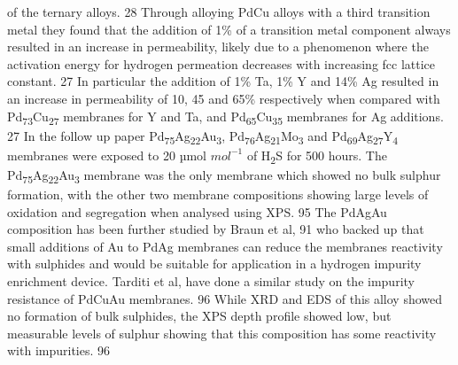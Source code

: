 of the ternary alloys. 28 Through alloying PdCu alloys with a third transition metal they 
found that the addition of 1\% of a transition metal component always resulted in an increase 
in permeability, likely due to a phenomenon where the activation energy for hydrogen 
permeation decreases with increasing fcc lattice constant. 27 In particular the addition of 
1\% Ta, 1\% Y and 14\% Ag resulted in an increase in permeability of 10, 45 and 65\% 
respectively when compared with Pd\textsubscript{73}Cu\textsubscript{27} membranes for 
Y and Ta, and Pd\textsubscript{65}Cu\textsubscript{35} membranes for Ag additions. 27 
In the follow up paper Pd\textsubscript{75}Ag\textsubscript{22}Au\textsubscript{3},
Pd\textsubscript{76}Ag\textsubscript{21}Mo\textsubscript{3} and Pd\textsubscript{69}Ag\textsubscript{27}Y\textsubscript{4} 
membranes were exposed to 20 µmol $mol^{-1}$ of H\textsubscript{2}S for 500 hours. 
The Pd\textsubscript{75}Ag\textsubscript{22}Au\textsubscript{3} membrane was the only 
membrane which showed no bulk sulphur formation, with the other two membrane compositions 
showing large levels of oxidation and segregation when analysed using XPS. 95 The 
PdAgAu composition has been further studied by Braun et al, 91 who backed up that small 
additions of Au to PdAg membranes can reduce the membranes reactivity with sulphides and 
would be suitable for application in a hydrogen impurity enrichment device. 
Tarditi et al, have done a similar study on the impurity resistance of PdCuAu membranes. 96 
While XRD and EDS of this alloy showed no formation of bulk sulphides, the XPS depth 
profile showed low, but measurable levels of sulphur showing that this composition has some 
reactivity with impurities. 96

\renewcommand{\bibname}{References}





